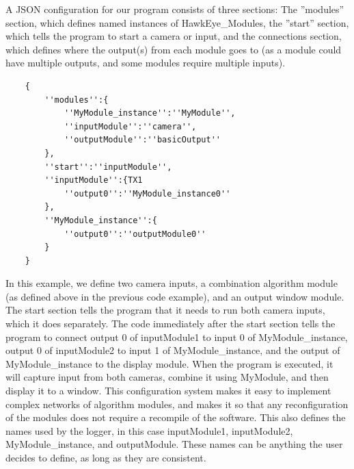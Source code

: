 \documentclass[letterpaper,10pt,titlepage]{IEEEtran}
\begin{document}
\par
A JSON configuration for our program consists of three sections: The ''modules'' section, which defines named instances of HawkEye\_Modules, the ''start'' section, which tells the program to start a camera or input, and the connections section, which defines where the output(s) from each module goes to (as a module could have multiple outputs, and some modules require multiple inputs).\\
   \begin{lstlisting}
   	{
		''modules'':{
			''MyModule_instance'':''MyModule'',
			''inputModule'':''camera'',
			''outputModule'':''basicOutput''
		},
		''start'':''inputModule'',
		''inputModule'':{TX1
			''output0'':''MyModule_instance0''
		},
		''MyModule_instance'':{
			''output0'':''outputModule0''
		}
	}
   \end{lstlisting}
 \par 
   In this example, we define two camera inputs, a combination algorithm module (as defined above in the previous code example), and an output window module. The start section tells the program that it needs to run both camera inputs, which it does separately. The code immediately after the start section tells the program to connect output 0 of inputModule1 to input 0 of MyModule\_instance, output 0 of inputModule2 to input 1 of MyModule\_instance, and the output of MyModule\_instance to the display module. When the program is executed, it will capture input from both cameras, combine it using MyModule, and then display it to a window. This configuration system makes it easy to implement complex networks of algorithm modules, and makes it so that any reconfiguration of the modules does not require a recompile of the software. This also defines the names used by the logger, in this case inputModule1, inputModule2, MyModule\_instance, and outputModule. These names can be anything the user decides to define, as long as they are consistent.
\end{document}
